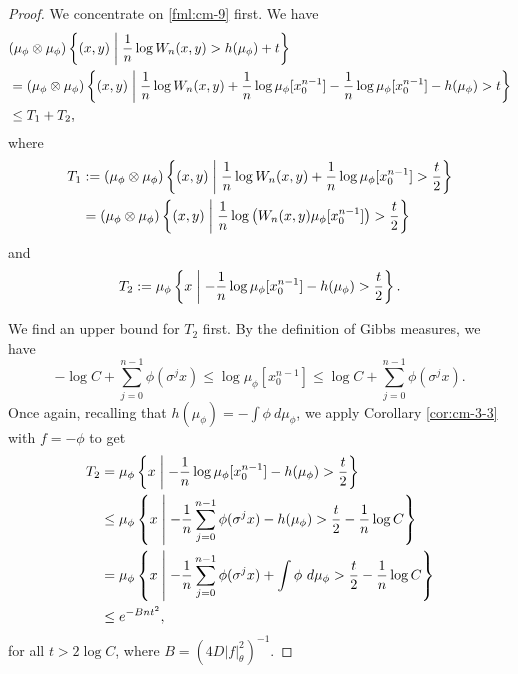 \begin{theorem}
	\begin{proof}
		We concentrate on \eqref{fml:cm-9} first. We have
		\begin{align*}
			&(\mu_\phi \otimes \mu_\phi)\left\{(x, y) \midmid \frac{1}{n}\log{W_n(x, y)} > h(\mu_\phi) + t\right\} \\
				&= (\mu_\phi \otimes \mu_\phi)\left\{(x, y) \midmid \frac{1}{n}\log{W_n(x, y)} + \frac{1}{n}\log{\mu_\phi[x_0^{n - 1}]} - \frac{1}{n}\log{\mu_\phi[x_0^{n - 1}]} - h(\mu_\phi) > t\right\} \\
				&\leq T_1 + T_2, %
		\end{align*}
		where
		\begin{align*}
			T_1 &:= (\mu_\phi \otimes \mu_\phi)\left\{(x, y) \mathrel{}\middle|\mathrel{} \frac{1}{n}\log{W_n(x, y)} + \frac{1}{n}\log{\mu_\phi[x_0^{n - 1}]} > \frac{t}{2}\right\} \\
				&= (\mu_\phi \otimes \mu_\phi)\left\{(x, y) \mathrel{}\middle|\mathrel{} \frac{1}{n}\log\left(W_n(x, y) \mu_\phi[x_0^{n - 1}]\right) > \frac{t}{2}\right\}
		\end{align*}
		and
		\[
			T_2 := \mu_\phi\left\{x \mathrel{}\middle|\mathrel{} - \frac{1}{n}\log{\mu_\phi[x_0^{n - 1}]} - h(\mu_\phi) > \frac{t}{2}\right\}.
		\]
		
		We find an upper bound for $T_2$ first. By the definition of Gibbs measures, we have
		\begin{equation}\label{fml:gibbs-property}
			-\log{C} + \sum_{j = 0}^{n - 1}{\phi(\sigma^j{x})} \leq \log{\mu_\phi[x_0^{n - 1}]} \leq \log{C} + \sum_{j = 0}^{n - 1}{\phi(\sigma^j{x})}.
		\end{equation}
		Once again, recalling that $h(\mu_\phi) = -\int{\phi\ d\mu_\phi}$, we apply Corollary \ref{cor:cm-3-3} with $f = -\phi$ to get
		\begin{align*}
			T_2 &= \mu_\phi\left\{x \mathrel{}\middle|\mathrel{} - \frac{1}{n}\log{\mu_\phi[x_0^{n - 1}]} - h(\mu_\phi) > \frac{t}{2}\right\} \\
				&\leq \mu_\phi\left\{x \mathrel{}\middle|\mathrel{} -\frac{1}{n}\sum_{j = 0}^{n - 1}{\phi(\sigma^j{x})} -h(\mu_\phi) > \frac{t}{2} -\frac{1}{n}\log{C}\right\} \\
				&= \mu_\phi\left\{x \mathrel{}\middle|\mathrel{} -\frac{1}{n}\sum_{j = 0}^{n - 1}{\phi(\sigma^j{x})} + \int{\phi\ d\mu_\phi} > \frac{t}{2} -\frac{1}{n}\log{C}\right\} \\
				& \leq e^{-Bnt^2},
		\end{align*}
		for all $t > 2\log{C}$, where $B = (4D|f|_\theta^2)^{-1}$.
		

\end{proof}
\end{theorem}

